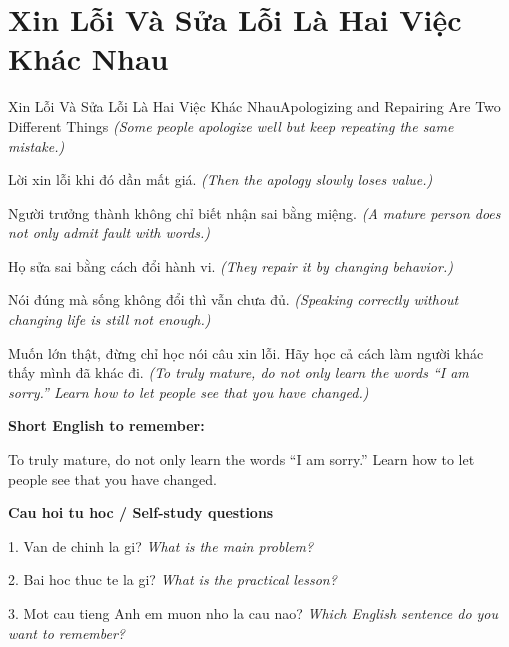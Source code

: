 \section{Xin Lỗi Và Sửa Lỗi Là Hai Việc Khác Nhau}
\begin{truyen}{Xin Lỗi Và Sửa Lỗi Là Hai Việc Khác Nhau}{Apologizing and Repairing Are Two Different Things}
\textit{(Some people apologize well but keep repeating the same mistake.)}

Lời xin lỗi khi đó dần mất giá.
\textit{(Then the apology slowly loses value.)}

Người trưởng thành không chỉ biết nhận sai bằng miệng.
\textit{(A mature person does not only admit fault with words.)}

Họ sửa sai bằng cách đổi hành vi.
\textit{(They repair it by changing behavior.)}

Nói đúng mà sống không đổi thì vẫn chưa đủ.
\textit{(Speaking correctly without changing life is still not enough.)}

\end{truyen}

\begin{baihoc}
Muốn lớn thật, đừng chỉ học nói câu xin lỗi. Hãy học cả cách làm người khác thấy mình đã khác đi.
\textit{(To truly mature, do not only learn the words “I am sorry.” Learn how to let people see that you have changed.)}
\end{baihoc}

\begin{ghinhoanh}
\textbf{Short English to remember:}

To truly mature, do not only learn the words “I am sorry.” Learn how to let people see that you have changed.

\end{ghinhoanh}

\begin{tuhocnhanh}
\textbf{Cau hoi tu hoc / Self-study questions}

1. Van de chinh la gi? \textit{What is the main problem?}

2. Bai hoc thuc te la gi? \textit{What is the practical lesson?}

3. Mot cau tieng Anh em muon nho la cau nao? \textit{Which English sentence do you want to remember?}
\end{tuhocnhanh}
\ngancach

